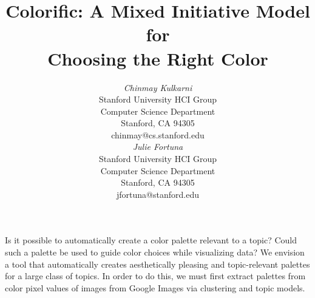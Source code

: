 \documentclass{article}
\newcommand{\system}{Colorific\xspace}
\begin{document}

 \toappear{}


\title{\system: A Mixed Initiative Model for \\Choosing the Right Color}


\author{
\parbox[t]{9cm}{\centering
	     {\em Chinmay Kulkarni}\\
	     Stanford University HCI Group\\
              Computer Science Department\\
	     Stanford, CA 94305\\
	     chinmay@cs.stanford.edu}
\parbox[t]{9cm}{\centering
	     {\em Julie Fortuna}\\
	     Stanford University HCI Group\\
              Computer Science Department\\
	     Stanford, CA 94305\\
	     jfortuna@stanford.edu}
}

\maketitle

\abstract
Is it possible to automatically create a color palette relevant to a topic? Could such a palette be used to guide color choices while visualizing data? We envision a tool that automatically creates aesthetically pleasing and topic-relevant palettes for a  large class of topics. In order to do this, we must first extract palettes from color pixel values of images from Google Images via clustering and topic models. 

\end{document}
